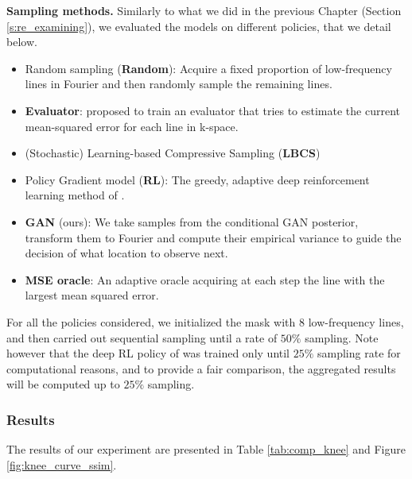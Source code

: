 \textbf{Sampling methods.}
Similarly to what we did in the previous Chapter (Section \ref{s:re_examining}), we evaluated the models on different policies, that we detail below.
\vspace{-2mm}
\begin{itemize}
    \item Random sampling (\textbf{Random}): Acquire a fixed proportion of low-frequency lines in Fourier and then randomly sample the remaining lines.\\[-.5cm]
    \item \textbf{Evaluator}: \citet{zhang2019reducing} proposed to train an evaluator that tries to estimate the current mean-squared error for each line in k-space. \\[-.5cm]
    \item (Stochastic) Learning-based Compressive Sampling (\textbf{LBCS}) \citep{gozcu2018learning, sanchez2019scalable}\\[-.5cm]
    \item Policy Gradient model (\textbf{RL}): The greedy, adaptive deep reinforcement learning method of \citet{bakker2020experimental}.\\[-.5cm]
    \item \textbf{GAN} (ours): We take samples from the conditional GAN posterior, transform them to Fourier and compute their empirical variance to guide the decision of what location to observe next.\\[-.5cm]
    \item \textbf{MSE oracle}: An adaptive oracle acquiring at each step the line with the largest mean squared error.\\[-.5cm]
\end{itemize}

For all the policies considered, we initialized the mask with $8$ low-frequency lines, and then carried out sequential sampling until a rate of $50\%$ sampling. Note however that the deep RL policy of \citet{bakker2020experimental} was trained only until $25\%$ sampling rate for computational reasons, and to provide a fair comparison, the aggregated results will be computed up to $25\%$ sampling.


\subsubsection{Results}
The results of our experiment are presented in Table \ref{tab:comp_knee} and Figure \ref{fig:knee_curve_ssim}.

